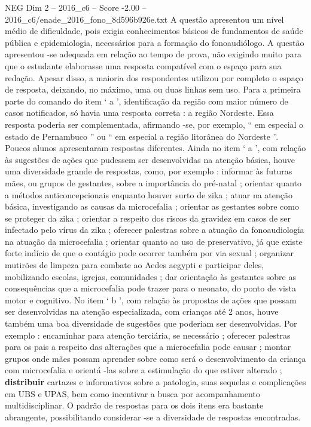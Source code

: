 \begin{textsample}{NEG Dim 2 – 2016\_c6 – Score -2.00 – 2016\_c6/enade\_2016\_fono\_8d596b926e.txt}
A questão apresentou um nível médio de dificuldade, pois exigia conhecimentos básicos de fundamentos de saúde pública e epidemiologia, necessários para a formação do fonoaudiólogo.
A questão apresentou -se adequada em relação ao tempo de prova, não exigindo muito para que o estudante elaborasse uma resposta compatível com o espaço para sua redação.
Apesar disso, a maioria dos respondentes utilizou por completo o espaço de resposta, deixando, no máximo, uma ou duas linhas sem uso.
Para a primeira parte do comando do item ‘ a ’, identificação da região com maior número de casos notificados, só havia uma resposta correta : a região Nordeste.
Essa resposta poderia ser complementada, afirmando -se, por exemplo, “ em especial o estado de Pernambuco ” ou “ em especial a região litorânea do Nordeste ”.
Poucos alunos apresentaram respostas diferentes.
Ainda no item ‘ a ’, com relação às sugestões de ações que pudessem ser desenvolvidas na atenção básica, houve uma diversidade grande de respostas, como, por exemplo : informar às futuras mães, ou grupos de gestantes, sobre a importância do pré-natal ; orientar quanto a métodos anticoncepcionais enquanto houver surto de zika ; atuar na atenção básica, investigando as causas da microcefalia ; orientar as gestantes sobre como se proteger da zika ; orientar a respeito dos riscos da gravidez em casos de ser infectado pelo vírus da zika ; oferecer palestras sobre a atuação da fonoaudiologia na atuação da microcefalia ; orientar quanto ao uso de preservativo, já que existe forte indício de que o contágio pode ocorrer também por via sexual ; organizar mutirões de limpeza para combate ao Aedes aegypti e participar deles, mobilizando escolas, igrejas, comunidades ; dar orientação às gestantes sobre as consequências que a microcefalia pode trazer para o neonato, do ponto de vista motor e cognitivo.
No item ‘ b ’, com relação às propostas de ações que possam ser desenvolvidas na atenção especializada, com crianças até 2 anos, houve também uma boa diversidade de sugestões que poderiam ser desenvolvidas.
Por exemplo : encaminhar para atenção terciária, se necessário ; oferecer palestras para os pais a respeito das alterações que a microcefalia pode causar ; montar grupos onde mães possam aprender sobre como será o desenvolvimento da criança com microcefalia e orientá -las sobre a estimulação do que estiver alterado ; \textbf{distribuir} cartazes e informativos sobre a patologia, suas sequelas e complicações em UBS e UPAS, bem como incentivar a busca por acompanhamento multidisciplinar.
O padrão de respostas para os dois itens era bastante abrangente, possibilitando considerar -se a diversidade de respostas encontradas.

\end{textsample}
